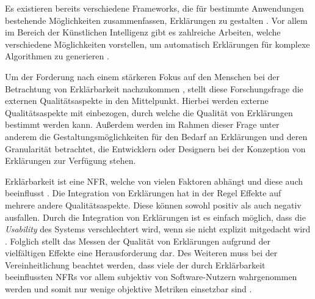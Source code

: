 \smallskip

\noindent{}

\smallskip

Es existieren bereits verschiedene Frameworks, die für bestimmte Anwendungen bestehende Möglichkeiten zusammenfassen, Erklärungen zu gestalten \cite{nunes_systematic_2017}. Vor allem im Bereich der Künstlichen Intelligenz gibt es zahlreiche Arbeiten, welche verschiedene Möglichkeiten vorstellen, um automatisch Erklärungen für komplexe Algorithmen zu generieren \cite{sokol_explainability_2020, mahoney2019framework}.

Um der Forderung nach einem stärkeren Fokus auf den Menschen bei der Betrachtung von Erklärbarkeit nachzukommen \cite{ehsan_operationalizing_2021}, stellt diese Forschungsfrage die externen Qualitätsaspekte \cite{international2011iso} in den Mittelpunkt. Hierbei werden externe Qualitätsaspekte mit einbezogen, durch welche die Qualität von Erklärungen bestimmt werden kann. Außerdem werden im Rahmen dieser Frage unter anderem die Gestaltungsmöglichkeiten für den Bedarf an Erklärungen und deren Granularität betrachtet, die Entwicklern oder Designern bei der Konzeption von Erklärungen zur Verfügung stehen. 


\smallskip

\noindent{}

\smallskip

Erklärbarkeit ist eine NFR, welche von vielen Faktoren abhängt und diese auch beeinflusst \cite{chazette_knowledge_nodate}. Die Integration von Erklärungen hat in der Regel Effekte auf mehrere andere Qualitätsaspekte. Diese können sowohl positiv als auch negativ ausfallen. Durch die Integration von Erklärungen ist es einfach möglich, dass die \textit{Usability} des Systems verschlechtert wird, wenn sie nicht explizit mitgedacht wird \cite{sokol_explainability_2020}. Folglich stellt das Messen der Qualität von Erklärungen aufgrund der vielfältigen Effekte eine Herausforderung dar. Des Weiteren muss bei der Vereinheitlichung beachtet werden, dass viele der durch Erklärbarkeit beeinflussten NFRs vor allem subjektiv von Software-Nutzern wahrgenommen werden und somit nur wenige objektive Metriken einsetzbar sind \cite{sokol_explainability_2020}.

